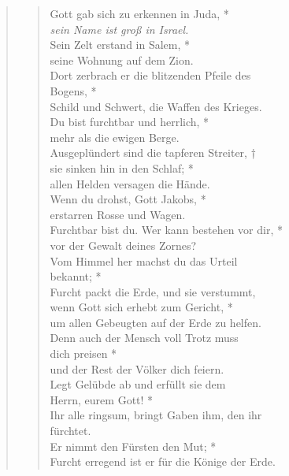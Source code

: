 \vspace{0.3cm}

\newpage
{}

\begin{quote}
 


\begin{verse}
Gott gab sich zu erkennen in Juda, *\\
\textit{sein Name ist groß in Israel.}\\
\vin Sein Zelt erstand in Salem, *\\
\vin seine Wohnung auf dem Zion.\\ 
Dort zerbrach er die blitzenden Pfeile des\\ Bogens, *\\
Schild und Schwert, die Waffen des Krieges.\\
\vin Du bist furchtbar und herrlich, *\\
\vin mehr als die ewigen Berge.\\
Ausgeplündert sind die tapferen Streiter, †\\
sie sinken hin in den Schlaf; *\\ 
allen Helden versagen die Hände.\\ 
\vin Wenn du drohst, Gott Jakobs, *\\
\vin erstarren Rosse und Wagen.\\
Furchtbar bist du. Wer kann bestehen vor dir, *\\
vor der Gewalt deines Zornes? \\
\vin Vom Himmel her machst du das Urteil\\ \vin  bekannt; *\\
\vin Furcht packt die Erde, und sie verstummt,\\
wenn Gott sich erhebt zum Gericht, *\\
um allen Gebeugten auf der Erde zu helfen.\\ 
\vin Denn auch der Mensch voll Trotz muss \\ \vin dich preisen *\\
\vin und der Rest der Völker dich feiern.\\
Legt Gelübde ab und erfüllt sie dem\\ Herrn, eurem Gott! *\\
Ihr alle ringsum, bringt Gaben ihm, den ihr\\ fürchtet.\\ 
\vin Er nimmt den Fürsten den Mut; *\\
\vin Furcht erregend ist er für die Könige der Erde.\\


\end{verse}

\end{quote}




